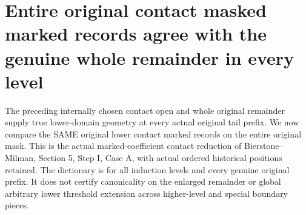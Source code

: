 \section{Entire original contact masked marked records agree with the genuine whole remainder in every level}

The preceding internally chosen contact open and whole original remainder
supply true lower-domain geometry at every actual original tail prefix.
We now compare the SAME original lower contact marked records on the entire
original mask. This is the actual marked-coefficient contact reduction of
Bierstone--Milman\cite{bierstone-milman08-functoriality}, Section 5, Step I,
Case A, with actual ordered historical positions retained. The dictionary is
for all induction levels and every genuine original prefix. It does not
certify canonicality on the enlarged remainder or global arbitrary lower
threshold extension across higher-level and special boundary pieces.

